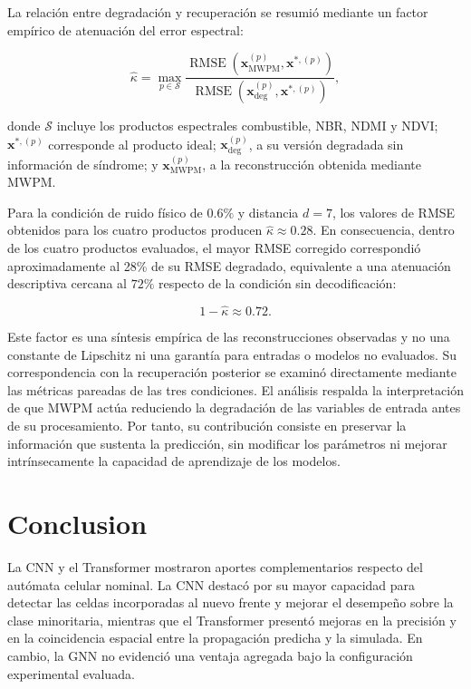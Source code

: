 \documentclass[fleqn,10pt]{wlscirep}
\begin{document}
La relación entre degradación y recuperación se resumió mediante un factor empírico de atenuación del error espectral:

\begin{equation}
\widehat{\kappa} =
\max_{p\in\mathcal{S}}
\frac{
\operatorname{RMSE}\!\left(\mathbf{x}_{\mathrm{MWPM}}^{(p)},\mathbf{x}^{*,(p)}\right)
}{
\operatorname{RMSE}\!\left(\mathbf{x}_{\mathrm{deg}}^{(p)},\mathbf{x}^{*,(p)}\right)
},
\label{eq:kappa}
\end{equation}

donde $\mathcal{S}$ incluye los productos espectrales combustible,
NBR, NDMI y NDVI; $\mathbf{x}^{*,(p)}$ corresponde al producto ideal;
$\mathbf{x}_{\mathrm{deg}}^{(p)}$, a su versión degradada sin información de síndrome; y $\mathbf{x}_{\mathrm{MWPM}}^{(p)}$, a la reconstrucción obtenida mediante MWPM.

Para la condición de ruido físico de $0.6\%$ y distancia $d=7$, los
valores de RMSE obtenidos para los cuatro productos producen
$\widehat{\kappa}\approx0.28$. En consecuencia, dentro de los cuatro productos evaluados, el mayor RMSE corregido correspondió aproximadamente al 28\% de su RMSE degradado, equivalente a una atenuación descriptiva cercana al
$72\%$ respecto de la condición sin
decodificación:

\begin{equation}
1-\widehat{\kappa}\approx0.72.
\label{eq:error_reduction}
\end{equation}

Este factor es una síntesis empírica de las reconstrucciones observadas y no una constante de Lipschitz ni una garantía para entradas o modelos no evaluados. Su correspondencia con la recuperación posterior se examinó directamente mediante las métricas pareadas de las tres condiciones. El análisis respalda la interpretación de que MWPM actúa reduciendo
la degradación de las variables de entrada antes de su procesamiento.
Por tanto, su contribución consiste en preservar la información que
sustenta la predicción, sin modificar los parámetros ni mejorar
intrínsecamente la capacidad de aprendizaje de los modelos.

\section*{Conclusion}

La CNN y el Transformer mostraron aportes complementarios respecto del
autómata celular nominal. La CNN destacó por su mayor capacidad para detectar
las celdas incorporadas al nuevo frente y mejorar el desempeño sobre la
clase minoritaria, mientras que el Transformer presentó mejoras en la
precisión y en la coincidencia espacial entre la propagación predicha y
la simulada. En cambio, la GNN no evidenció una ventaja agregada bajo
la configuración experimental evaluada.
\end{document}
